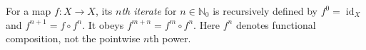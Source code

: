 
For a map $f:X\to X$, its \emph{$n$th iterate} for $n\in\mathbb N_0$ is recursively defined by $f^0=\operatorname{id}_X$ and $f^{n+1}=f\circ f^n$. It obeys $f^{m+n}=f^m\circ f^n$. Here $f^n$ denotes functional composition, not the pointwise $n$th power.
